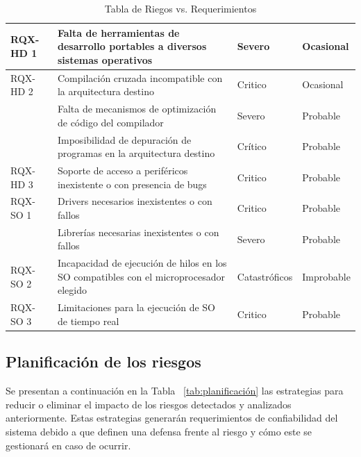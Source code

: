 \begin{table}[!h]
\begin{tabular}{ p{2.5cm} p{9cm} p{2cm} p{2cm} }
		\hline
		RQX-HD 1& Falta de herramientas de desarrollo portables a diversos sistemas operativos & Severo  &  Ocasional\\
		\hline		
		RQX-HD 2& Compilación cruzada incompatible con la arquitectura destino  & Critico &  Ocasional\\
		\hline
				& Falta de mecanismos de optimización de código del compilador  & Severo  &  Probable\\
		\hline
				& Imposibilidad de depuración de programas en la arquitectura destino& Crítico  &  Probable\\
		\hline
		RQX-HD 3& Soporte de acceso a periféricos inexistente o con presencia de bugs & Critico &  Probable\\
		\hline
		RQX-SO 1& Drivers necesarios inexistentes o con fallos & Critico &  Probable\\
		\hline
				& Librerías necesarias inexistentes o con fallos & Severo &  Probable\\
		\hline
		RQX-SO 2& Incapacidad de ejecución de hilos en los SO compatibles con el microprocesador elegido & Catastróficos & Improbable\\
		\hline
		RQX-SO 3& Limitaciones para la ejecución de SO de tiempo real & Critico & Probable\\
		\hline
		\end{tabular}
		\caption{Tabla de Riegos vs. Requerimientos}
		\label{tab:riegos}
		\end{table}
	
		\newpage
		\subsection{Planificación de los riesgos}	

Se presentan a continuación en la Tabla ~\ref {tab:planificación} las estrategias para reducir o eliminar el impacto de los riesgos detectados y analizados anteriormente. Estas estrategias generarán requerimientos de confiabilidad del sistema debido a que definen una defensa frente al riesgo y cómo este se gestionará en caso de ocurrir.
	
